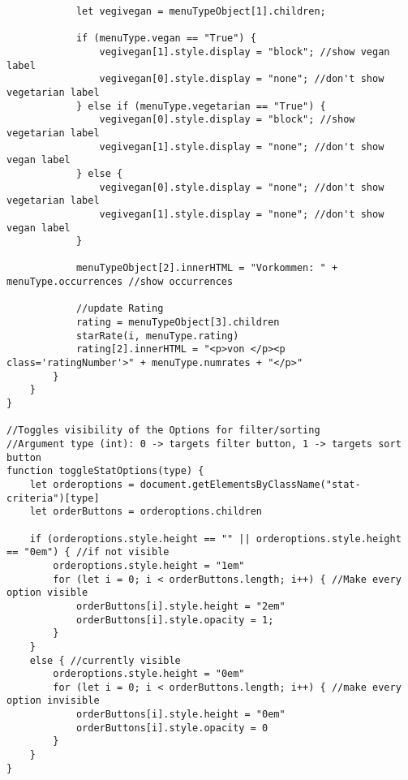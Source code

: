 \begin{lstlisting}
            let vegivegan = menuTypeObject[1].children;

            if (menuType.vegan == "True") {
                vegivegan[1].style.display = "block"; //show vegan label
                vegivegan[0].style.display = "none"; //don't show vegetarian label
            } else if (menuType.vegetarian == "True") {
                vegivegan[0].style.display = "block"; //show vegetarian label
                vegivegan[1].style.display = "none"; //don't show vegan label
            } else {
                vegivegan[0].style.display = "none"; //don't show vegetarian label
                vegivegan[1].style.display = "none"; //don't show vegan label
            }

            menuTypeObject[2].innerHTML = "Vorkommen: " + menuType.occurrences //show occurrences

            //update Rating
            rating = menuTypeObject[3].children
            starRate(i, menuType.rating)
            rating[2].innerHTML = "<p>von </p><p class='ratingNumber'>" + menuType.numrates + "</p>"
        }
    }
}

//Toggles visibility of the Options for filter/sorting
//Argument type (int): 0 -> targets filter button, 1 -> targets sort button
function toggleStatOptions(type) {
    let orderoptions = document.getElementsByClassName("stat-criteria")[type]
    let orderButtons = orderoptions.children

    if (orderoptions.style.height == "" || orderoptions.style.height == "0em") { //if not visible
        orderoptions.style.height = "1em"
        for (let i = 0; i < orderButtons.length; i++) { //Make every option visible
            orderButtons[i].style.height = "2em"
            orderButtons[i].style.opacity = 1;
        }
    }
    else { //currently visible
        orderoptions.style.height = "0em"
        for (let i = 0; i < orderButtons.length; i++) { //make every option invisible
            orderButtons[i].style.height = "0em"
            orderButtons[i].style.opacity = 0
        }
    }
}
\end{lstlisting}